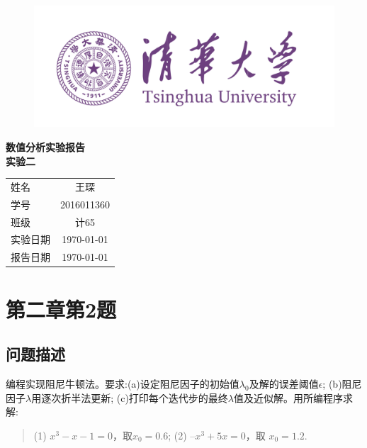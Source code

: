 \documentclass[12pt, utf8, hyperref]{article}
\begin{document}
\begin{titlepage}

\begin{figure}[H]
	\centering
	\includegraphics[scale=0.5]{photos/logo.png}
\end{figure}

\phantom{Start!}
\vspace{1.7cm}
\begin{center}

{ \Huge \bfseries 数值分析实验报告}\\[0.4cm]
{ \large \bfseries 实验二}
\end{center}

\vfill

\begin{center}
{
\newcommand{\pillar}{ {\Huge \phantom{A}} }
\large
\begin{tabular}{lc}
\pillar 姓名 & 王琛 \\\cline{2-2}
\pillar 学号 & 2016011360 \\\cline{2-2}
\pillar 班级 & 计65 \\\cline{2-2}
\pillar 实验日期 & \today \\\cline{2-2}
\pillar 报告日期 & \today \\\cline{2-2}
\end{tabular}
}
\end{center}
\end{titlepage}
 
\section{第二章第2题}
\subsection*{问题描述}
编程实现阻尼牛顿法。要求:(a)设定阻尼因子的初始值$\lambda_{0}$及解的误差阈值$\epsilon$; (b)阻尼因子$\lambda$用逐次折半法更新; (c)打印每个迭代步的最终$\lambda$值及近似解。用所编程序求解:
\begin{quote}
(1) $x^3-x-1=0$，取$x_{0}=0.6$; \newline
(2) $–x^3+5x=0$，取 $x_{0}=1.2$.
\end{quote}
\end{document}
